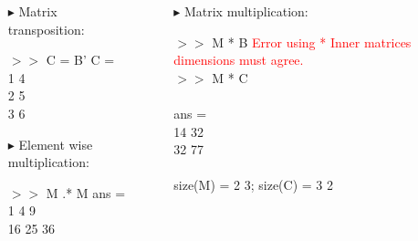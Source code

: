 \documentclass[xcolor={dvipsnames,rgb}, aspectratio=169]{beamer}
\begin{document}
\begin{frame}{}
\begin{columns}
\begin{itemize}
   \item[$\blacktriangleright$] Matrix transposition:
   \begin{tcolorbox}[colback=white,colframe=bluepoli]
      $>>$ C = B'
      \tcblower
      C = \\
      \hspace{3em} 1 \hspace{3em} 4 \\
      \hspace{3em} 2 \hspace{3em} 5 \\
      \hspace{3em} 3 \hspace{3em} 6 
   \end{tcolorbox}

   \vspace{-10pt}
   \item[$\blacktriangleright$] Element wise multiplication:
   \begin{tcolorbox}[colback=white,colframe=bluepoli]
      $>>$ M .* M
      \tcblower
      ans = \\
      \hspace{3em} 1 \hspace{3em} 4  \hspace{3em} 9\\
      \hspace{3em} 16 \hspace{3em} 25 \hspace{3em} 36
   \end{tcolorbox}
\end{itemize}

\vspace{-10pt}
   \begin{itemize}
      \item[$\blacktriangleright$] Matrix multiplication:
      \begin{tcolorbox}[colback=white,colframe=bluepoli]
         $>>$ M * B
         \tcblower
         \textcolor{red}{\small{Error using * Inner matrices dimensions must agree.}}
         \DrawLine \\
         $>>$ M * C \\
         \DrawLine \\
         ans = \\
         14 \hspace{3em}32 \\
         32 \hspace{3em}77 \\
         \DrawLine \\
         \textcolor{codegreen}{size(M) = 2 3; size(C) =  3 2}
      \end{tcolorbox}
   \end{itemize}
\end{columns}
\end{frame}
\end{document}
